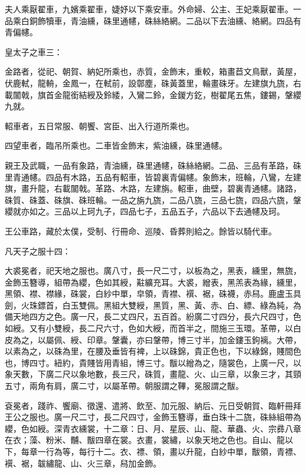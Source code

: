 \begin{pinyinscope}
 夫人乘厭翟車，九嬪乘翟車，婕妤以下乘安車。外命婦、公主、王妃乘厭翟車。一品乘白銅飾犢車，青油纁，硃里通幰，硃絲絡網。二品以下去油纁、絡網。四品有青偏幰。



 皇太子之車三：



 金路者，從祀、朝賀、納妃所乘也，赤質，金飾末，重較，箱畫苣文鳥獸，黃屋，伏鹿軾，龍輈，金鳳一，在軾前，設鄣塵，硃黃蓋里，輪畫硃牙。左建旗九旒，右載闟戟，旗首金龍銜結綬及鈴緌，入鸞二鈴，金鍐方釳，樹翟尾五焦，鏤錫，鞶纓九就。



 軺車者，五日常服、朝饗、宮臣、出入行道所乘也。



 四望車者，臨吊所乘也。二車皆金飾末，紫油纁，硃里通幰。



 親王及武職，一品有象路，青油纁，硃里通幰，硃絲絡網。二品、三品有革路，硃里青通幰。四品有木路，五品有軺車，皆碧裏青偏幰。象飾末，班輪，八鸞，左建旗，畫升龍，右載闟戟。革路、木路，左建旃。軺車，曲壁，碧裏青通幰。諸路，硃質、硃蓋、硃旗、硃班輪。一品之旃九旒，二品八旒，三品七旒，四品六旒，鞶纓就亦如之。三品以上珂九子，四品七子，五品五子，六品以下去通幰及珂。



 王公車路，藏於太僕，受制、行冊命、巡陵、昏葬則給之。餘皆以騎代車。



 凡天子之服十四：



 大裘冕者，祀天地之服也。廣八寸，長一尺二寸，以板為之，黑表，纁里，無旒，金飾玉簪導，組帶為纓，色如其綬，黈纊充耳。大裘，繒表，黑羔表為緣，纁里，黑領、襟、襟緣，硃裳，白紗中單，皁領，青襟、襈、裾，硃襪，赤舄。鹿盧玉具劍，火珠鏢首，白玉雙佩。黑組大雙綬，黑質，黑、黃、赤、白、縹、綠為純，為備天地四方之色。廣一尺，長二丈四尺，五百首。紛廣二寸四分，長六尺四寸，色如綬。又有小雙綬，長二尺六寸，色如大綬，而首半之，間施三玉環。革帶，以白皮為之，以屬佩、綬、印章。鞶囊，亦曰鞶帶，博三寸半，加金鏤玉鉤褵。大帶，以素為之，以硃為里，在腰及垂皆有裨，上以硃錦，貴正色也，下以綠錦，賤間色也，博四寸。紐約，貴賤皆用青組，博三寸。黻以繒為之，隨裳色，上廣一尺，以象天數，下廣二尺以象地數，長三尺，硃質，畫龍、火、山三章，以象三才，其頸五寸，兩角有肩，廣二寸，以屬革帶。朝服謂之鞸，冕服謂之黻。



 袞冕者，踐祚、饗廟、徵還、遣將、飲至、加元服、納后、元日受朝賀、臨軒冊拜王公之服也。廣一尺二寸，長二尺四寸，金飾玉簪導，垂白珠十二旒，硃絲組帶為纓，色如綬。深青衣纁裳，十二章：日、月、星辰、山、龍、華蟲、火、宗彞八章在衣；藻、粉米、黼、黻四章在裳。衣畫，裳繡，以象天地之色也。自山、龍以下，每章一行為等，每行十二。衣、褾、領，畫以升龍，白紗中單，黻領，青褾、襈、裾，韍繡龍、山、火三章，舄加金飾。




\end{pinyinscope}
